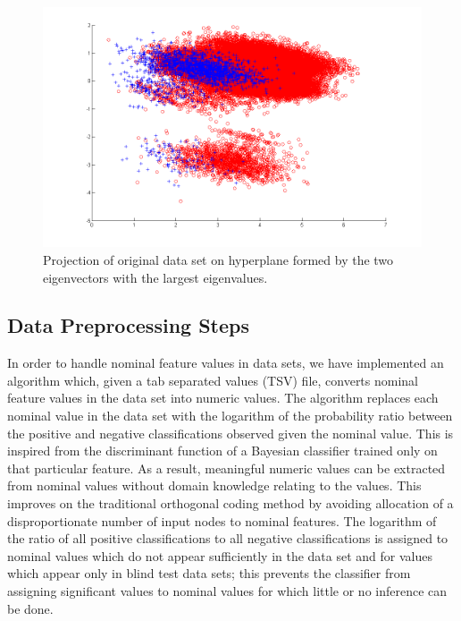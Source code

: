 \documentclass[11pt]{article}       %
\begin{document}
\begin{figure}[h]
	\centering
	\includegraphics[width=\textwidth]{fishers_2d}
	\caption{Projection of original data set on hyperplane formed by the two eigenvectors with the largest eigenvalues.}
	\label{fig:fishers-2d}
\end{figure}

\subsection{Data Preprocessing Steps} \label{preprocessing}
In order to handle nominal feature values in data sets, we have implemented an algorithm which, given a tab separated values (TSV) file, converts nominal feature values in the data set into numeric values.  The algorithm replaces each nominal value in the data set with the logarithm of the probability ratio between the positive and negative classifications observed given the nominal value.  This is inspired from the discriminant function of a Bayesian classifier trained only on that particular feature. As a result, meaningful numeric values can be extracted from nominal values without domain knowledge relating to the values. This improves on the traditional orthogonal coding method \cite[slide 17]{MLP-NominalCoding} by avoiding allocation of a disproportionate number of input nodes to nominal features.  The logarithm of the ratio of all positive classifications to all negative classifications is assigned to nominal values which do not appear sufficiently in the data set and for values which appear only in blind test data sets; this prevents the classifier from assigning significant values to nominal values for which little or no inference can be done.
\end{document}
